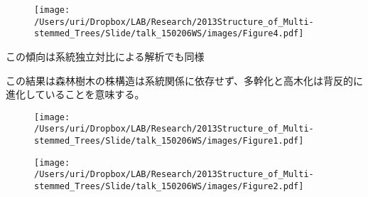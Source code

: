 \documentclass[a0, 36pt, plainboxedsections]{sciposter} %
\renewcommand{\baselinestretch}{1.2}
\begin{document}
\begin{multicols}{2}
\begin{figure}
\begin{center}
		\texttt{[image: /Users/uri/Dropbox/LAB/Research/2013Structure\_of\_Multi-stemmed\_Trees/Slide/talk\_150206WS/images/Figure4.pdf]}
	\end{center}
\end{figure}

\columnbreak
\renewcommand{\baselinestretch}{0.8}
\begin{mdframed}[style=subsection.frame]
  \huge\textbf{}
\end{mdframed}
\renewcommand{\baselinestretch}{1.2} %


この傾向は系統独立対比による解析でも同様

この結果は森林樹木の株構造は系統関係に依存せず、多幹化と高木化は背反的に進化していることを意味する。

\begin{figure}
	\begin{center}
		\texttt{[image: /Users/uri/Dropbox/LAB/Research/2013Structure\_of\_Multi-stemmed\_Trees/Slide/talk\_150206WS/images/Figure1.pdf]}
		
		\texttt{[image: /Users/uri/Dropbox/LAB/Research/2013Structure\_of\_Multi-stemmed\_Trees/Slide/talk\_150206WS/images/Figure2.pdf]}
	\end{center}
\end{figure}

\end{multicols}
\begin{mdframed}[style=section.frame]
  \centering\huge\textbf{}
\end{mdframed}
\end{document}
